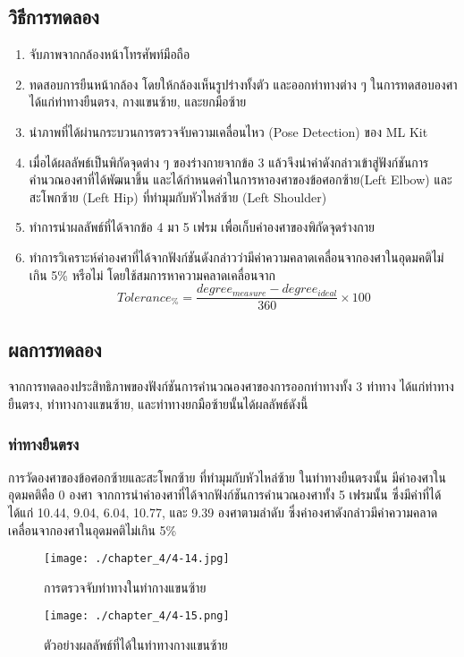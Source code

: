 \subsection{วิธีการทดลอง}
\begin{enumerate}
	\item จับภาพจากกล้องหน้าโทรศัพท์มือถือ
	\item ทดสอบการยืนหน้ากล้อง โดยให้กล้องเห็นรูปร่างทั้งตัว และออกท่าทางต่าง ๆ ในการทดสอบองศา ได้แก่ท่าทางยืนตรง, กางแขนซ้าย, และยกมือซ้าย
	\item นำภาพที่ได้ผ่านกระบวนการตรวจจับความเคลื่อนไหว (Pose Detection) ของ ML Kit
	\item เมื่อได้ผลลัพธ์เป็นพิกัดจุดต่าง ๆ ของร่างกายจากข้อ 3 แล้วจึงนำค่าดังกล่าวเข้าสู่ฟังก์ชันการคำนวณองศาที่ได้พัฒนาขึ้น และได้กำหนดค่าในการหาองศาของข้อศอกซ้าย(Left Elbow) และสะโพกซ้าย (Left Hip) ที่ทำมุมกับหัวไหล่ซ้าย (Left Shoulder)
	\item ทำการนำผลลัพธ์ที่ได้จากข้อ 4 มา 5 เฟรม เพื่อเก็บค่าองศาของพิกัดจุดร่างกาย
	\item ทำการวิเคราะห์ค่าองศาที่ได้จากฟังก์ชันดังกล่าวว่ามีค่าความคลาดเคลื่อนจากองศาในอุดมคติไม่เกิน 5\% หรือไม่ โดยใช้สมการหาความคลาดเคลื่อนจาก
	      \begin{equation}
		      Tolerance_\%=\frac{degree_{measure} - degree_{ideal}}{360} \times 100
	      \end{equation}
\end{enumerate}
\subsection{ผลการทดลอง}
จากการทดลองประสิทธิภาพของฟังก์ชันการคำนวณองศาของการออกท่าทางทั้ง 3 ท่าทาง ได้แก่ท่าทางยืนตรง, ท่าทางกางแขนซ้าย, และท่าทางยกมือซ้ายนั้นได้ผลลัพธ์ดังนี้
\subsubsection{ท่าทางยืนตรง}
การวัดองศาของข้อศอกซ้ายและสะโพกซ้าย ที่ทำมุมกับหัวไหล่ซ้าย ในท่าทางยืนตรงนั้น มีค่าองศาในอุดมคติคือ 0 องศา จากการนำค่าองศาที่ได้จากฟังก์ชันการคำนวณองศาทั้ง 5 เฟรมนั้น ซึ่งมีค่าที่ได้ ได้แก่ 10.44, 9.04, 6.04, 10.77, และ 9.39 องศาตามลำดับ ซึ่งค่าองศาดังกล่าวมีค่าความคลาดเคลื่อนจากองศาในอุดมคติไม่เกิน 5\%
\begin{figure}
	\texttt{[image: ./chapter\_4/4-14.jpg]}
	\caption{การตรวจจับท่าทางในท่ากางแขนซ้าย}
\end{figure}
\begin{figure}
	\texttt{[image: ./chapter\_4/4-15.png]}
	\caption{ตัวอย่างผลลัพธ์ที่ได้ในท่าทางกางแขนซ้าย}
\end{figure}
